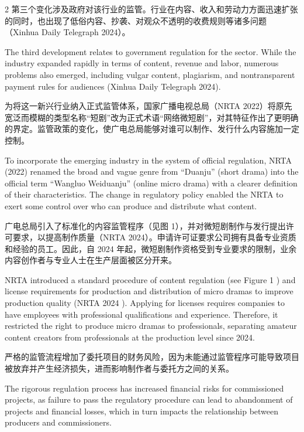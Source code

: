 \documentclass[10pt,a4paper]{article}
\begin{document}
\begin{paracol}{2}
\switchcolumn*
第三个变化涉及政府对该行业的监管。行业在内容、收入和劳动力方面迅速扩张的同时，也出现了低俗内容、抄袭、对观众不透明的收费规则等诸多问题（Xinhua Daily Telegraph 2024）。\par
\switchcolumn
The third development relates to government regulation for the sector. While the industry expanded rapidly in terms of content, revenue and labor, numerous problems also emerged, including vulgar content, plagiarism, and nontransparent payment rules for audiences (Xinhua Daily Telegraph 2024).\par
\switchcolumn*
为将这一新兴行业纳入正式监管体系，国家广播电视总局（NRTA 2022）将原先宽泛而模糊的类型名称“短剧”改为正式术语“网络微短剧”，对其特征作出了更明确的界定。监管政策的变化，使广电总局能够对谁可以制作、发行什么内容施加一定控制。\par
\switchcolumn
To incorporate the emerging industry in the system of official regulation, NRTA (2022) renamed the broad and vague genre from “Duanju” (short drama) into the official term “Wangluo Weiduanju” (online micro drama) with a clearer definition of their characteristics. The change in regulatory policy enabled the NRTA to exert some control over who can produce and distribute what content.\par
\switchcolumn*
广电总局引入了标准化的内容监管程序（见图 1），并对微短剧制作与发行提出许可要求，以提高制作质量（NRTA 2024）。申请许可证要求公司拥有具备专业资质和经验的员工。因此，自 2024 年起，微短剧制作资格受到专业要求的限制，业余内容创作者与专业人士在生产层面被区分开来。\par
\switchcolumn
NRTA introduced a standard procedure of content regulation (see Figure 1 ) and license requirements for production and distribution of micro dramas to improve production quality (NRTA 2024 ). Applying for licenses requires companies to have employees with professional qualifications and experience. Therefore, it restricted the right to produce micro dramas to professionals, separating amateur content creators from professionals at the production level since 2024.\par
\switchcolumn*
严格的监管流程增加了委托项目的财务风险，因为未能通过监管程序可能导致项目被放弃并产生经济损失，进而影响制作者与委托方之间的关系。\par
\switchcolumn
The rigorous regulation process has increased financial risks for commissioned projects, as failure to pass the regulatory procedure can lead to abandonment of projects and financial losses, which in turn impacts the relationship between producers and commissioners.\par
\switchcolumn*
\end{paracol}
\end{document}
